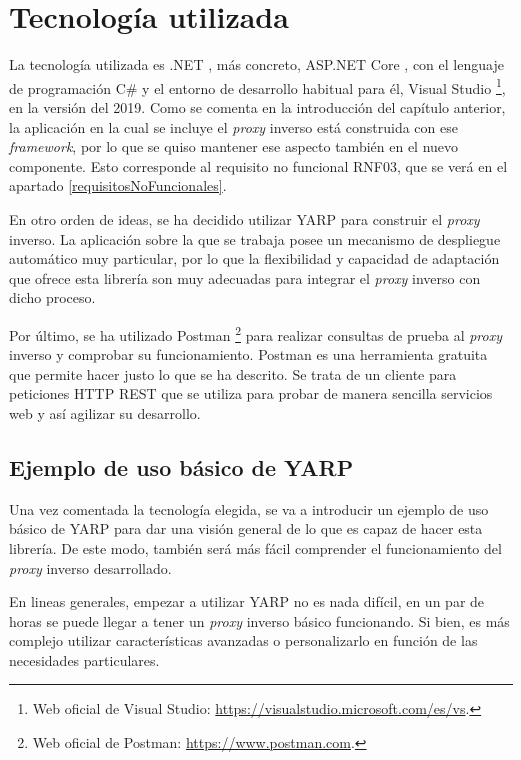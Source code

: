 \documentclass[11pt,spanish,listoffigures]{tfgetsinf}
\begin{document}
\chapter{Tecnología utilizada} \label{tecnologiaUtilizada}

La tecnología utilizada es .NET \cite{DotNet}, más concreto, ASP.NET Core \cite{DotNetCore}, con el lenguaje de programación C\# \cite{Csharp} y el entorno de desarrollo habitual para él, Visual Studio \footnote{Web oficial de Visual Studio: \url{https://visualstudio.microsoft.com/es/vs}.}, en la versión del 2019. Como se comenta en la introducción del capítulo anterior, la aplicación en la cual se incluye el \emph{proxy} inverso está construida con ese \emph{framework}, por lo que se quiso mantener ese aspecto también en el nuevo componente. Esto corresponde al requisito no funcional RNF03, que se verá en el apartado \ref{requisitosNoFuncionales}.

En otro orden de ideas, se ha decidido utilizar YARP para construir el \emph{proxy} inverso. La aplicación sobre la que se trabaja posee un mecanismo de despliegue automático muy particular, por lo que la flexibilidad y capacidad de adaptación que ofrece esta librería son muy adecuadas para integrar el \emph{proxy} inverso con dicho proceso.

Por último, se ha utilizado Postman \footnote{Web oficial de Postman: \url{https://www.postman.com}.} para realizar consultas de prueba al \emph{proxy} inverso y comprobar su funcionamiento. Postman es una herramienta gratuita que permite hacer justo lo que se ha descrito. Se trata de un cliente para peticiones HTTP REST que se utiliza para probar de manera sencilla servicios web y así agilizar su desarrollo.


	\section{Ejemplo de uso básico de YARP} \label{ejemploUsoYARP}

Una vez comentada la tecnología elegida, se va a introducir un ejemplo de uso básico de YARP para dar una visión general de lo que es capaz de hacer esta librería. De este modo, también será más fácil comprender el funcionamiento del \emph{proxy} inverso desarrollado.

En lineas generales, empezar a utilizar YARP no es nada difícil, en un par de horas se puede llegar a tener un \emph{proxy} inverso básico funcionando. Si bien, es más complejo utilizar características avanzadas o personalizarlo en función de las necesidades particulares.
\end{document}

